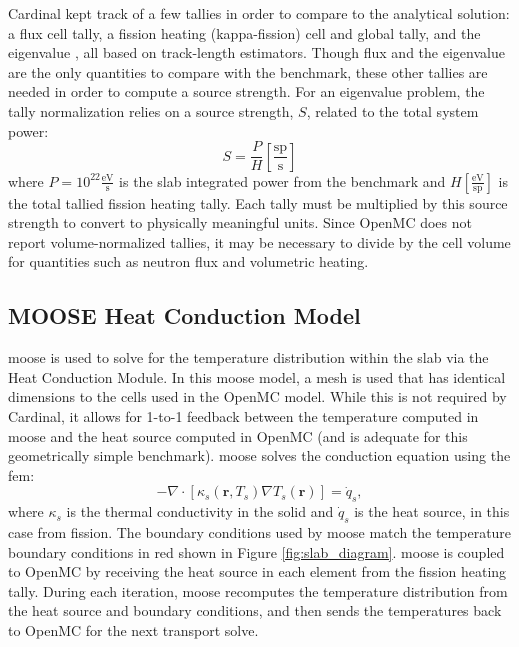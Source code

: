 \documentclass[letterpaper]{mc2023}
\begin{document}
Cardinal kept track of a few tallies in order to compare to the analytical solution: a flux cell tally, a fission heating (kappa-fission)
cell and global tally, and the eigenvalue \keff, all based on track-length estimators. Though flux and the eigenvalue are the only quantities
to compare with the benchmark, these other tallies are needed in order to compute a source strength. For an eigenvalue problem, the tally
normalization relies on a source strength, $S$, related to the total system power:
\begin{equation} \label{eq:source_strength}
   S = \frac{P}{H} \left[\frac{\textrm{sp}}{\textrm{s}} \right]
\end{equation}
where $P=10^{22} \frac{\textrm{eV}}{\textrm{s}}$ is the slab integrated power from the benchmark and $H \left[\frac{\textrm{eV}}{\textrm{sp}} \right]$
is the total tallied fission heating tally. Each tally must be multiplied by this source strength to convert to physically meaningful units.
Since OpenMC does not report volume-normalized tallies, it may be necessary to divide by the cell volume for quantities such as neutron flux and
volumetric heating.

\subsection{MOOSE Heat Conduction Model}
\gls{moose} is used to solve for the temperature distribution within the slab via the Heat Conduction Module. In this \gls{moose}
model, a mesh is used that has identical dimensions to the cells used in the OpenMC model. While this is not required by Cardinal,
it allows for 1-to-1 feedback between the temperature computed in \gls{moose} and the heat source computed in OpenMC (and is
adequate for this geometrically simple benchmark). \gls{moose} solves the conduction equation using the \gls{fem}:
\begin{equation}\label{eq:conduction}
    - \nabla \cdot [\kappa_{s}(\mathbf{r},T_{s}) \nabla T_{s}(\mathbf{r})] = \dot{q}_{s},
\end{equation}
where $\kappa_{s}$ is the thermal conductivity in the solid and $\dot{q}_{s}$ is the heat source, in this case from fission. The
boundary conditions used by \gls{moose} match the temperature boundary conditions in red shown in Figure \ref{fig:slab_diagram}.
\gls{moose} is coupled to OpenMC by receiving the heat source in each element from the fission heating tally. During each iteration,
\gls{moose} recomputes the temperature distribution from the heat source and boundary conditions, and then sends the temperatures
back to OpenMC for the next transport solve.
\end{document}
